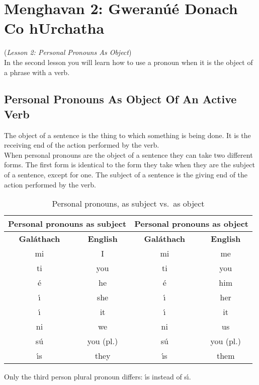 \section{Menghavan 2: Gweran\'{u}\'{e} Donach Co hUrchatha}
(\textit{Lesson 2: Personal Pronouns As Object})\\

In the second lesson you will learn how to use a pronoun when it is the object of a phrase with a verb.
\subsection{Personal Pronouns As Object Of An Active Verb}

The object of a sentence is the thing to which something is being done. It is the receiving end of the action performed by the verb.\\

When personal pronouns are the object of a sentence they can take two different forms. The first form is identical to the form they take when they are the subject of a sentence, except for one. The subject of a sentence is the giving end of the action performed by the verb.

\begin{table}[H]
\centering
\begin{tabular}{cccc}
  \toprule
  \multicolumn{2}{c}{\textbf{Personal pronouns as subject}} & \multicolumn{2}{c}{\textbf{Personal pronouns as object}}\\
  \midrule
  \textbf{Gal\'{a}thach} & \textbf{English} & \textbf{Gal\'{a}thach} & \textbf{English}\\
  \cmidrule(lr){1-1}\cmidrule(lr){2-2}\cmidrule(lr){3-3}\cmidrule(lr){4-4}
  mi & I & mi & me\\
  ti & you & ti & you\\
  \'{e} & he & \'{e} & him\\
  \'{\i} & she & \'{\i} & her\\
  \'{\i} & it & \'{\i} & it\\
  ni & we & ni & us\\
  s\'{u} & you (pl.) & s\'{u} & you (pl.)\\
  \'{\i}s & they & \'{\i}s & them\\
  \bottomrule
\end{tabular}
\caption{Personal pronouns, as subject vs.\ as object}
\label{personal_pronouns_subject_object}
\end{table}

Only the third person plural pronoun differs: \'{\i}s instead of s\'{\i}.\\

